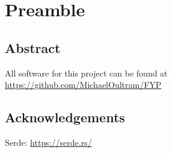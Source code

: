\section{Preamble}
\subsection{Abstract}

All software for this project can be found at \url{https://github.com/MichaelOultram/FYP}

\subsection{Acknowledgements}
Serde: \url{https://serde.rs/}
